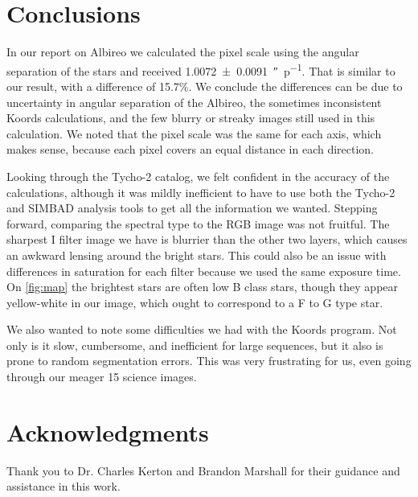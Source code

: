 \documentclass[%
aip,
jmp,
reprint,
floatfix,
nofootinbib
]{revtex4-1}
\begin{document}
	
	


	\section{Conclusions}
	
	In our report on Albireo we calculated the pixel scale using the angular separation of the stars and received \SI{1.0072\pm.0091}{\arcsecond\per p}. That is similar to our result, with a difference of 15.7\%. We conclude the differences can be due to uncertainty in angular separation of the Albireo, the sometimes inconsistent Koords calculations, and the few blurry or streaky images still used in this calculation. We noted that the pixel scale was the same for each axis, which makes sense, because each pixel covers an equal distance in each direction.	
	
	Looking through the Tycho-2 catalog, we felt confident in the accuracy of the calculations, although it was mildly inefficient to have to use both the Tycho-2 and SIMBAD analysis tools to get all the information we wanted. Stepping forward, comparing the spectral type to the RGB image was not fruitful. The sharpest I filter image we have is blurrier than the other two layers, which causes an awkward lensing around the bright stars. This could also be an issue with differences in saturation for each filter because we used the same exposure time. On \autoref{fig:map} the brightest stars are often low B class stars, though they appear yellow-white in our image, which ought to correspond to a F to G type star. 
	
	We also wanted to note some difficulties we had with the Koords program. Not only is it slow, cumbersome, and inefficient for large sequences, but it also is prone to random segmentation errors. This was very frustrating for us, even going through our meager 15 science images.


	\section*{Acknowledgments}

	Thank you to Dr. Charles Kerton and Brandon Marshall for their guidance and assistance in this work.
	\medskip
	
\end{document}

